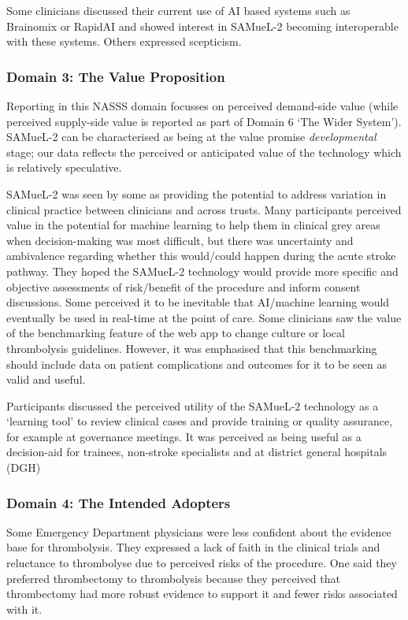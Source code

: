 Some clinicians discussed their current use of AI based systems such as Brainomix or RapidAI and showed interest in SAMueL-2 becoming interoperable with these systems. Others expressed scepticism.

\subsubsection{Domain 3: The Value Proposition}

Reporting in this NASSS domain focusses on perceived demand-side value (while perceived supply-side value is reported as part of Domain 6 ‘The Wider System’). SAMueL-2 can be characterised as being at the value promise \textit{developmental} stage; our data reflects the perceived or anticipated value of the technology which is relatively speculative.

SAMueL-2 was seen by some as providing the potential to address variation in clinical practice between clinicians and across trusts. Many participants perceived value in the potential for machine learning to help them in clinical grey areas when decision-making was most difficult, but there was uncertainty and ambivalence regarding whether this would/could happen during the acute stroke pathway. They hoped the SAMueL-2 technology would provide more specific and objective assessments of risk/benefit of the procedure and inform consent discussions. Some perceived it to be inevitable that AI/machine learning would eventually be used in real-time at the point of care. Some clinicians saw the value of the benchmarking feature of the web app to change culture or local thrombolysis guidelines. However, it was emphasised that this benchmarking should include data on patient complications and outcomes for it to be seen as valid and useful.

Participants discussed the perceived utility of the SAMueL-2 technology as a ‘learning tool’ to review clinical cases and provide training or quality assurance, for example at governance meetings. It was perceived as being useful as a decision-aid for trainees, non-stroke specialists and at district general hospitals (DGH)

\subsubsection{Domain 4: The Intended Adopters}

Some Emergency Department physicians were less confident about the evidence base for thrombolysis. They expressed a lack of faith in the clinical trials and reluctance to thrombolyse due to perceived risks of the procedure. One said they preferred thrombectomy to thrombolysis because they perceived that thrombectomy had more robust evidence to support it and fewer risks associated with it.

